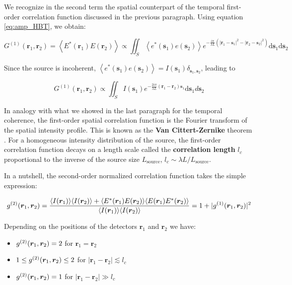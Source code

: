 \noindent We recognize in the second term the spatial counterpart of the temporal first-order correlation function discussed in the previous paragraph. Using equation \ref{eq:amp_HBT}, we obtain:

\begin{equation}
    G^{(1)}\left(\bm{r}_{1}, \bm{r}_{2}\right)=\left\langle E^*(\bm{r}_1) E(\bm{r}_2)\right\rangle \propto \iint_{S}\left\langle e^{*}(\bm{s}_1) e(\bm{s}_2)\right\rangle e^{-\frac{i \pi}{\lambda L}\left(\left|\bm{r}_{1}-\bm{s}_1\right|^{2}-\left|\bm{r}_{2}-\bm{s}_2\right|^{2}\right)} \mathrm{d} \bm{s}_1 \mathrm{d} \bm{s}_2
\end{equation}

\noindent Since the source is incoherent, $\left\langle e^{*}(\bm{s}_1) e(\bm{s}_2)\right\rangle = I(\bm{s}_1) \delta_{\bm{s}_1,\bm{s}_2}$, leading to

\begin{equation}
    G^{(1)}\left(\bm{r}_{1}, \bm{r}_{2}\right) \propto \iint_{S} I(\bm{s}_1) e^{-\frac{2 i \pi}{\lambda L}\left(\bm{r}_{1}-\bm{r}_{2}\right) \bm{s}_1} \mathrm{d} \bm{s}_1 d \bm{s}_2
\end{equation}

\noindent In analogy with what we showed in the last paragraph for the temporal coherence, the first-order spatial correlation function is the Fourier transform of the spatial intensity profile. This is known as the \textbf{Van Cittert-Zernike} theorem \cite{goodman2007speckle}. For a homogeneous intensity distribution of the source, the first-order correlation function decays on a length scale called the \textbf{correlation length} $l_c$ proportional to the inverse of the source size $L_{\mathrm{source}}$, $l_c \sim \lambda L / L_{\mathrm{source}}$.

In a nutshell, the second-order normalized correlation function takes the simple expression:

\begin{equation}
    g^{(2)} (\bm{r}_1,\bm{r}_2) = \frac{\langle I(\bm{r}_1)\rangle \langle I(\bm{r}_2)\rangle + \langle E^*(\bm{r}_1) E(\bm{r}_2)\rangle \langle E(\bm{r}_1) E^*(\bm{r}_2)\rangle}{\langle I(\bm{r}_1)\rangle\langle I(\bm{r}_2)\rangle} = 1 + |g^{(1)}(\bm{r}_1,\bm{r}_2)|^2
\end{equation}

\noindent Depending on the positions of the detectors $\bm{r}_1$ and $\bm{r}_2$ we have:

\begin{itemize}
    \item $g^{(2)} (\bm{r}_1,\bm{r}_2)=2$ for $\bm{r}_1=\bm{r}_2$
    \item $1 \leq g^{(2)} (\bm{r}_1,\bm{r}_2) \leq 2$ for $|\bm{r}_1-\bm{r}_2| \lesssim l_{c}$
    \item $g^{(2)} (\bm{r}_1,\bm{r}_2)=1$ for $|\bm{r}_1-\bm{r}_2| \gg l_{c}$
\end{itemize}


